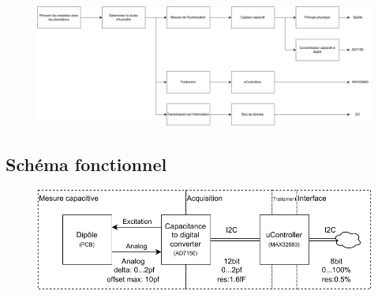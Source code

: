 \begin{figure}[!ht]
 \centering
 \includegraphics[width=16cm]{DiagrammeFAST.drawio.pdf}
\end{figure}

\subsection{Schéma fonctionnel}

\begin{figure}[!ht]
 \centering
 \includegraphics[width=16cm]{SchemaBlock.drawio.pdf}
\end{figure}
